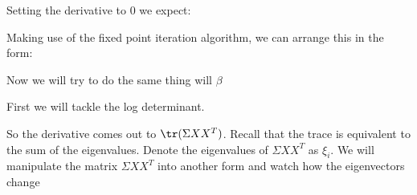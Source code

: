 \documentclass[12pt]{article}
\begin{document}
Setting the derivative to 0 we expect:


Making use of the fixed point iteration algorithm, we can arrange this in the form:


Now we will try to do the same thing will $\beta$

First we will tackle the log determinant.


So the derivative comes out to $\tr(\Sigma XX^T)$. Recall that the trace is equivalent to the sum of the eigenvalues. Denote the eigenvalues of $\Sigma XX^T$ as $\xi_i$. We will manipulate the matrix $\Sigma XX^T$ into another form and watch how the eigenvectors change

\end{document}

